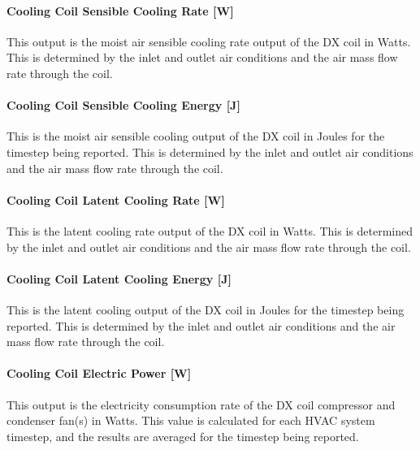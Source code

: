 \paragraph{Cooling Coil Sensible Cooling Rate {[}W{]}}\label{cooling-coil-sensible-cooling-rate-w}

This output is the moist air sensible cooling rate output of the DX coil in Watts. This is determined by the inlet and outlet air conditions and the air mass flow rate through the coil.

\paragraph{Cooling Coil Sensible Cooling Energy {[}J{]}}\label{cooling-coil-sensible-cooling-energy-j}

This is the moist air sensible cooling output of the DX coil in Joules for the timestep being reported. This is determined by the inlet and outlet air conditions and the air mass flow rate through the coil.

\paragraph{Cooling Coil Latent Cooling Rate {[}W{]}}\label{cooling-coil-latent-cooling-rate-w-2}

This is the latent cooling rate output of the DX coil in Watts. This is determined by the inlet and outlet air conditions and the air mass flow rate through the coil.

\paragraph{Cooling Coil Latent Cooling Energy {[}J{]}}\label{cooling-coil-latent-cooling-energy-j}

This is the latent cooling output of the DX coil in Joules for the timestep being reported. This is determined by the inlet and outlet air conditions and the air mass flow rate through the coil.

\paragraph{Cooling Coil Electric Power {[}W{]}}\label{cooling-coil-electric-power-w}

This output is the electricity consumption rate of the DX coil compressor and condenser fan(s) in Watts. This value is calculated for each HVAC system timestep, and the results are averaged for the timestep being reported.


